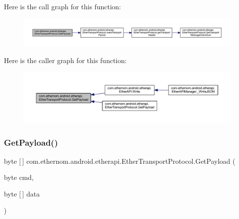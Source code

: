 Here is the call graph for this function\+:\nopagebreak
\begin{figure}[H]
\begin{center}
\leavevmode
\includegraphics[width=350pt]{classcom_1_1ethernom_1_1android_1_1etherapi_1_1_ether_transport_protocol_aa7834cb6d0b64e72dc913a5ec1cfcfb8_cgraph}
\end{center}
\end{figure}
Here is the caller graph for this function\+:
\nopagebreak
\begin{figure}[H]
\begin{center}
\leavevmode
\includegraphics[width=350pt]{classcom_1_1ethernom_1_1android_1_1etherapi_1_1_ether_transport_protocol_aa7834cb6d0b64e72dc913a5ec1cfcfb8_icgraph}
\end{center}
\end{figure}
\mbox{\label{classcom_1_1ethernom_1_1android_1_1etherapi_1_1_ether_transport_protocol_ac9ecf8d82db8ea4d83bbbf4face710b0}} 
\subsubsection{\texorpdfstring{Get\+Payload()}{GetPayload()}\hspace{0.1cm}{\footnotesize\ttfamily [2/6]}}
{\footnotesize\ttfamily byte \mbox{[}$\,$\mbox{]} com.\+ethernom.\+android.\+etherapi.\+Ether\+Transport\+Protocol.\+Get\+Payload (\begin{DoxyParamCaption}\item[{byte}]{cmd,  }\item[{byte \mbox{[}$\,$\mbox{]}}]{data }\end{DoxyParamCaption})}



